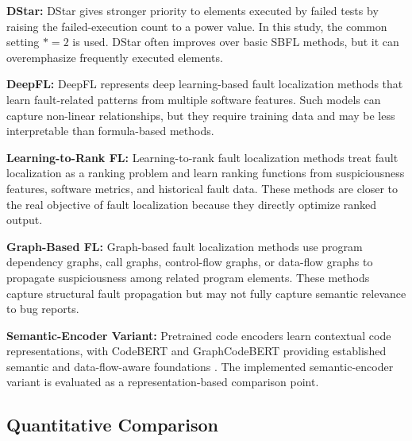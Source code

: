 \documentclass[article,article,submit,pdftex,moreauthors]{Definitions/mdpi}
\begin{document}
\textbf{DStar:} DStar gives stronger priority to elements executed by failed tests by raising the failed-execution count to a power value. In this study, the common setting $*=2$ is used. DStar often improves over basic SBFL methods, but it can overemphasize frequently executed elements.

\textbf{DeepFL:} DeepFL represents deep learning-based fault localization methods that learn fault-related patterns from multiple software features. Such models can capture non-linear relationships, but they require training data and may be less interpretable than formula-based methods.

\textbf{Learning-to-Rank FL:} Learning-to-rank fault localization methods treat fault localization as a ranking problem and learn ranking functions from suspiciousness features, software metrics, and historical fault data. These methods are closer to the real objective of fault localization because they directly optimize ranked output.

\textbf{Graph-Based FL:} Graph-based fault localization methods use program dependency graphs, call graphs, control-flow graphs, or data-flow graphs to propagate suspiciousness among related program elements. These methods capture structural fault propagation but may not fully capture semantic relevance to bug reports.

\textbf{Semantic-Encoder Variant:} Pretrained code encoders learn contextual code representations, with CodeBERT and GraphCodeBERT providing established semantic and data-flow-aware foundations \cite{feng2020codebert,guo2021graphcodebert}. The implemented semantic-encoder variant is evaluated as a representation-based comparison point.

\subsection{Quantitative Comparison}
\end{document}
